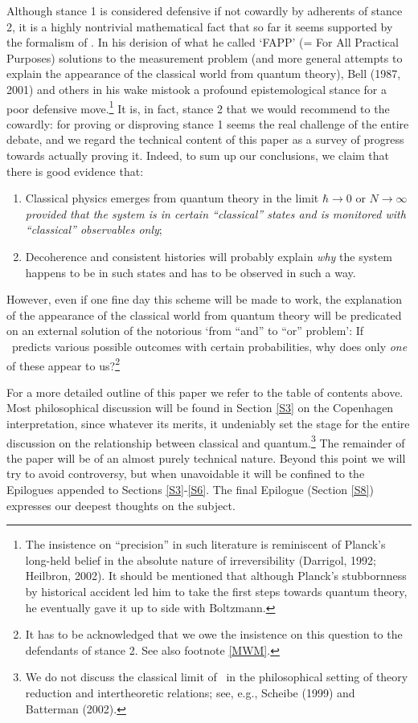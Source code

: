 \documentclass[12pt,titlepage]{article}
\newcommand{\raw}{\rightarrow} \newcommand{\rat}{\mapsto}
\begin{document}
Although stance 1 is considered defensive if not cowardly by adherents of stance 2, it is a highly nontrivial mathematical fact that so far it seems supported by the formalism of \qm. In his derision  of what he called `FAPP' (= For All Practical Purposes) solutions to the 
measurement problem (and more general attempts to explain the appearance of the classical world from quantum theory), Bell (1987, 2001)  and others in his wake mistook a profound epistemological stance for a poor defensive move.\footnote{The insistence on ``precision'' in such literature is reminiscent of Planck's long-held belief in the absolute nature of irreversibility (Darrigol, 1992; Heilbron, 2002). It should be mentioned that although Planck's stubbornness by historical accident led him to take the first steps towards quantum theory, he eventually gave it up to side with Boltzmann.} It is, in fact, stance 2 that we would recommend to the cowardly: for 
 proving  or disproving stance 1 seems the real challenge of the entire debate, and we regard the technical content of this paper as a survey of progress towards actually proving it. Indeed, to sum up our conclusions, we claim that there is good evidence that:
\begin{enumerate}
\item Classical physics emerges from quantum theory in the limit $\hbar\rightarrow 0$ or  $N\raw\infty$ {\it provided that the system is in certain ``classical'' states and is monitored 
with ``classical'' observables only};
\item Decoherence and consistent histories will probably  explain  {\it why} the system happens to be in such states and has to be observed in such a way.
\end{enumerate}
However, even if one fine day this scheme will be made to work, the explanation of the appearance of the classical world from quantum theory will be predicated on an external solution of the notorious `from ``and'' to ``or'' problem': If \qm\ predicts various possible outcomes with certain probabilities, why does only {\it one} of these appear to us?\footnote{It has to be acknowledged that we owe the insistence on this question to the defendants of stance 2.
See also footnote \ref{MWM}.}

For a more detailed outline of this paper we refer to the table of contents above. Most philosophical discussion will be found in Section \ref{S3} on the Copenhagen interpretation, since whatever its merits, it undeniably set the stage for the entire discussion on the relationship between classical and quantum.\footnote{We do not discuss the classical limit of \qm\ in the philosophical setting of theory reduction and intertheoretic relations;
see, e.g.,  Scheibe (1999) and Batterman (2002).}
 The remainder of the paper will be of an almost purely technical nature. Beyond this point we will  try to avoid controversy, but 
when unavoidable it will be  confined to the Epilogues appended to Sections \ref{S3}-\ref{S6}. 
The final Epilogue (Section \ref{S8}) expresses our deepest thoughts on the subject. 
\end{document}
